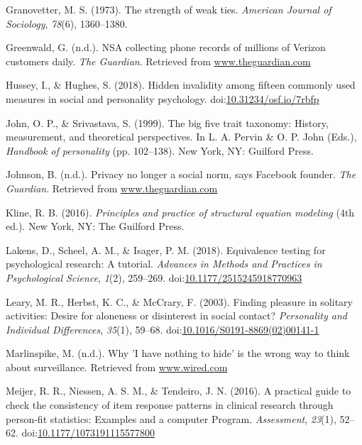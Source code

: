 \documentclass[man,floatsintext]{apa6}
\theoremstyle{definition}
\theoremstyle{definition}
\theoremstyle{definition}
\theoremstyle{remark}
\begin{document}
\leavevmode\hypertarget{ref-Granovetter.1973}{}%
Granovetter, M. S. (1973). The strength of weak ties. \emph{American
Journal of Sociology}, \emph{78}(6), 1360--1380.

\leavevmode\hypertarget{ref-Greenwald.2013}{}%
Greenwald, G. (n.d.). NSA collecting phone records of millions of
Verizon customers daily. \emph{The Guardian}. Retrieved from
\url{www.theguardian.com}

\leavevmode\hypertarget{ref-Hussey.2018}{}%
Hussey, I., \& Hughes, S. (2018). Hidden invalidity among fifteen
commonly used measures in social and personality psychology.
doi:\href{https://doi.org/10.31234/osf.io/7rbfp}{10.31234/osf.io/7rbfp}

\leavevmode\hypertarget{ref-John.1999}{}%
John, O. P., \& Srivastava, S. (1999). The big five trait taxonomy:
History, measurement, and theoretical perspectives. In L. A. Pervin \&
O. P. John (Eds.), \emph{Handbook of personality} (pp. 102--138). New
York, NY: Guilford Press.

\leavevmode\hypertarget{ref-Johnson.2010}{}%
Johnson, B. (n.d.). Privacy no longer a social norm, says Facebook
founder. \emph{The Guardian}. Retrieved from \url{www.theguardian.com}

\leavevmode\hypertarget{ref-Kline.2016}{}%
Kline, R. B. (2016). \emph{Principles and practice of structural
equation modeling} (4th ed.). New York, NY: The Guilford Press.

\leavevmode\hypertarget{ref-Lakens.2018}{}%
Lakens, D., Scheel, A. M., \& Isager, P. M. (2018). Equivalence testing
for psychological research: A tutorial. \emph{Advances in Methods and
Practices in Psychological Science}, \emph{1}(2), 259--269.
doi:\href{https://doi.org/10.1177/2515245918770963}{10.1177/2515245918770963}

\leavevmode\hypertarget{ref-Leary.2003}{}%
Leary, M. R., Herbst, K. C., \& McCrary, F. (2003). Finding pleasure in
solitary activities: Desire for aloneness or disinterest in social
contact? \emph{Personality and Individual Differences}, \emph{35}(1),
59--68.
doi:\href{https://doi.org/10.1016/S0191-8869(02)00141-1}{10.1016/S0191-8869(02)00141-1}

\leavevmode\hypertarget{ref-Marlinspike.2013}{}%
Marlinspike, M. (n.d.). Why 'I have nothing to hide' is the wrong way to
think about surveillance. Retrieved from \url{www.wired.com}

\leavevmode\hypertarget{ref-Meijer.2016}{}%
Meijer, R. R., Niessen, A. S. M., \& Tendeiro, J. N. (2016). A practical
guide to check the consistency of item response patterns in clinical
research through person-fit statistics: Examples and a computer Program.
\emph{Assessment}, \emph{23}(1), 52--62.
doi:\href{https://doi.org/10.1177/1073191115577800}{10.1177/1073191115577800}
\end{document}
